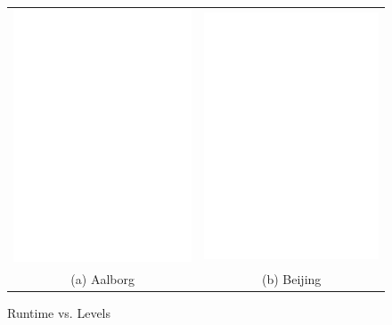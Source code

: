 \begin{figure}[htb]
\center
  \begin{tabular}{@{}c@{ }c@{}}
     \includegraphics[width=0.5\columnwidth]{figures/split_runtime_aal_server.pdf}
     &
     \includegraphics[width=0.5\columnwidth]{figures/split_runtime_bei_server.pdf}
      \\
     (a) Aalborg & (b)  Beijing
     \end{tabular}
\caption{Runtime vs. Levels}
\label{fig:levelVsruntime}
\end{figure}


